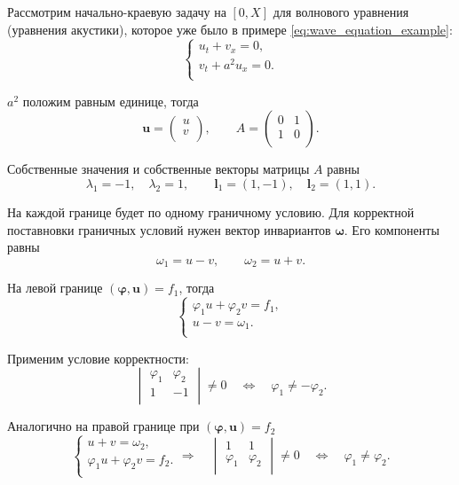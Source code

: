 \documentclass{article}
\begin{document}
\begin{example}\label{eq:boundary_problem_example}
	Рассмотрим начально-краевую задачу на $[0,X]$ для волнового уравнения
	(уравнения акустики), которое уже было в примере
	\eqref{eq:wave_equation_example}:
	\[\begin{cases}
		u_t+v_x=0, \\
		v_t+a^2u_x=0. \\
	\end{cases}\]

	$a^2$ положим равным единице, тогда
	\[\boldsymbol{u}=
		\begin{pmatrix}
			u \\
			v \\
		\end{pmatrix},
	\qquad
	A=
		\begin{pmatrix}
			0 & 1 \\
			1 & 0 \\
		\end{pmatrix}.
	\]

	Собственные значения и собственные векторы матрицы $A$ равны
	\[\lambda_1=-1,\quad \lambda_2=1,\qquad
	\boldsymbol{l}_1=(1,-1),\quad \boldsymbol{l}_2=(1,1).\]

	На каждой границе будет по одному граничному условию. Для корректной
	поставновки граничных условий нужен вектор инвариантов
	$\boldsymbol\omega$. Его компоненты равны
	\[\omega_1=u-v,\qquad \omega_2=u+v.\]

	На левой границе $(\boldsymbol\varphi,\boldsymbol u)=f_1$, тогда
	\[
		\begin{cases}
			\varphi_1 u+\varphi_2 v=f_1, \\
			u-v=\omega_1. \\
		\end{cases}
	\]

	Применим условие корректности:
	\[
		\begin{vmatrix}
			\varphi_1 & \varphi_2 \\
			1	& -1	\\
		\end{vmatrix}
		\ne 0\quad\Leftrightarrow\quad
		\varphi_1\ne -\varphi_2.
	\]

	Аналогично на правой границе при $(\boldsymbol\varphi,\boldsymbol u)=
	f_2$
	\[
		\begin{cases}
			u+v=\omega_2, \\
			\varphi_1 u+\varphi_2 v=f_2. \\
		\end{cases}
		\Rightarrow\quad
		\begin{vmatrix}
			1	& 1	\\
			\varphi_1 & \varphi_2 \\
		\end{vmatrix}
		\ne 0\quad\Leftrightarrow\quad
		\varphi_1\ne \varphi_2.
	\]
\end{example}
\end{document}
